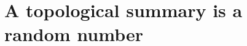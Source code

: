 \providecommand{\CrThBZero}{}\renewcommand{\CrThBZero}{1.11}
\providecommand{\CrBOne}{}\renewcommand{\CrBOne}{0.0271}
\providecommand{\CrRelBOne}{}\renewcommand{\CrRelBOne}{1.95}
\providecommand{\CrThBOne}{}\renewcommand{\CrThBOne}{1.09}
\providecommand{\CrBBoth}{}\renewcommand{\CrBBoth}{0.0139}
\providecommand{\CrRelBBoth}{}\renewcommand{\CrRelBBoth}{1.00}
\providecommand{\CrThBBoth}{}\renewcommand{\CrThBBoth}{1.00}
\providecommand{\CrPZero}{}\renewcommand{\CrPZero}{0.0229}
\providecommand{\CrRelPZero}{}\renewcommand{\CrRelPZero}{1.65}
\providecommand{\CrThPZero}{}\renewcommand{\CrThPZero}{0.65}
\providecommand{\CrPOne}{}\renewcommand{\CrPOne}{0.0291}
\providecommand{\CrRelPOne}{}\renewcommand{\CrRelPOne}{2.10}
\providecommand{\CrThPOne}{}\renewcommand{\CrThPOne}{0.62}
\providecommand{\CrPBoth}{}\renewcommand{\CrPBoth}{0.0133}
\providecommand{\CrRelPBoth}{}\renewcommand{\CrRelPBoth}{0.96}
\providecommand{\CrThPBoth}{}\renewcommand{\CrThPBoth}{0.59}
\providecommand{\CrNormBZero}{}\renewcommand{\CrNormBZero}{0.0241}
\providecommand{\CrNormBOne}{}\renewcommand{\CrNormBOne}{0.0276}
\providecommand{\CrNormBBoth}{}\renewcommand{\CrNormBBoth}{0.0167}
\providecommand{\CrAnBZeroTwo}{}\renewcommand{\CrAnBZeroTwo}{4}
\providecommand{\CrTpBZeroTwo}{}\renewcommand{\CrTpBZeroTwo}{7}
\providecommand{\CrAnBZeroFive}{}\renewcommand{\CrAnBZeroFive}{12}
\providecommand{\CrTpBZeroFive}{}\renewcommand{\CrTpBZeroFive}{17}
\providecommand{\CrAnBOneTwo}{}\renewcommand{\CrAnBOneTwo}{8}
\providecommand{\CrTpBOneTwo}{}\renewcommand{\CrTpBOneTwo}{4}
\providecommand{\CrAnBOneFive}{}\renewcommand{\CrAnBOneFive}{12}
\providecommand{\CrTpBOneFive}{}\renewcommand{\CrTpBOneFive}{10}
\providecommand{\CrAnPZeroTwo}{}\renewcommand{\CrAnPZeroTwo}{4}
\providecommand{\CrTpPZeroTwo}{}\renewcommand{\CrTpPZeroTwo}{12}
\providecommand{\CrAnPZeroFive}{}\renewcommand{\CrAnPZeroFive}{6}
\providecommand{\CrTpPZeroFive}{}\renewcommand{\CrTpPZeroFive}{24}
\providecommand{\CrAnPOneTwo}{}\renewcommand{\CrAnPOneTwo}{9}
\providecommand{\CrTpPOneTwo}{}\renewcommand{\CrTpPOneTwo}{10}
\providecommand{\CrAnPOneFive}{}\renewcommand{\CrAnPOneFive}{14}
\providecommand{\CrTpPOneFive}{}\renewcommand{\CrTpPOneFive}{23}
\providecommand{\CrAnPkTwo}{}\renewcommand{\CrAnPkTwo}{3}
\providecommand{\CrTpPkTwo}{}\renewcommand{\CrTpPkTwo}{1}
\providecommand{\CrAnPkFive}{}\renewcommand{\CrAnPkFive}{3}
\providecommand{\CrTpPkFive}{}\renewcommand{\CrTpPkFive}{2}
\providecommand{\CrShiftBZero}{}\renewcommand{\CrShiftBZero}{2.0}
\providecommand{\CrPdOverNorm}{}\renewcommand{\CrPdOverNorm}{0.80}
\section{A topological summary is a random number}
\label{12c:sec:random}

